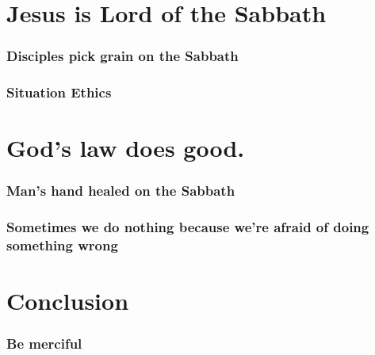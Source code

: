 \documentclass{beamer}
\begin{document}
\begin{frame}
\frametitle{}
\end{frame}

\section{Jesus is Lord of the Sabbath}

\begin{frame}
\frametitle{Disciples pick grain on the Sabbath}
\end{frame}

\begin{frame}
\frametitle{Situation Ethics}
\end{frame}

\section{God's law does good.}

\begin{frame}
\frametitle{Man's hand healed on the Sabbath}
\end{frame}

\begin{frame}
\frametitle{Sometimes we do nothing because we're afraid of doing something wrong}
\end{frame}

\section*{Conclusion}
\begin{frame}
\frametitle{Be merciful}
\end{frame}
\end{document}
